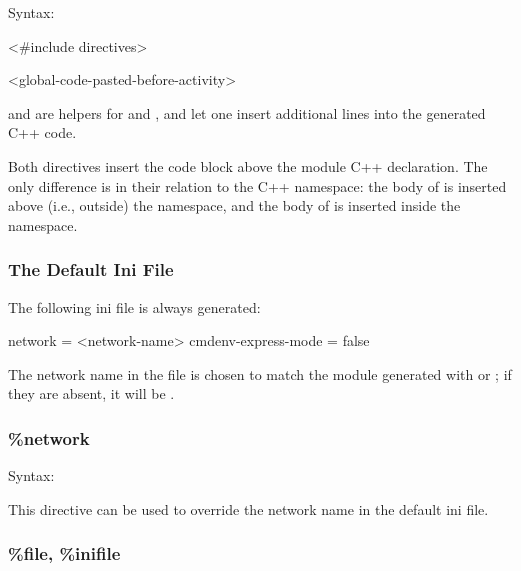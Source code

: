 Syntax:

\begin{filelisting}
<#include directives>
\end{filelisting}

\begin{filelisting}
<global-code-pasted-before-activity>
\end{filelisting}

 and  are helpers for 
and , and let one insert additional lines into the
generated C++ code.

Both directives insert the code block above the module C++ declaration. The only
difference is in their relation to the C++ namespace: the body of 
is inserted above (i.e., outside) the namespace, and the body of 
is inserted inside the namespace.


\subsubsection{The Default Ini File}
\label{sec:testing:opptest:default-ini-file}

The following ini file is always generated:

\begin{inifile}
[General]
network = <network-name>
cmdenv-express-mode = false
\end{inifile}

The network name in the file is chosen to match the module
generated with  or ; if they
are absent, it will be .

\subsubsection{\%network}
\label{sec:testing:opptest:network}

Syntax:

\begin{filelisting}
\end{filelisting}

This directive can be used to override the network name in the default ini file.


\subsubsection{\%file, \%inifile}
\label{sec:testing:opptest:file-and-inifile}

